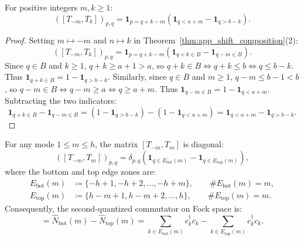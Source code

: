 \begin{lemma}
\label{lem:app_opposite_shift_matrix}
For positive integers $m, k \ge 1$:
\begin{equation}
([T_{-m}, T_k])_{p, q} = \mathbf{1}_{p = q + k - m} \left( \mathbf{1}_{q < a + m} - \mathbf{1}_{q > b - k} \right).
\end{equation}
\end{lemma}

\begin{proof}
Setting $m \mapsto -m$ and $n \mapsto k$ in Theorem~\ref{thm:app_shift_composition}(2):
\[
([T_{-m}, T_k])_{p, q} = \mathbf{1}_{p = q + k - m} \left( \mathbf{1}_{q + k \in B} - \mathbf{1}_{q - m \in B} \right).
\]
Since $q \in B$ and $k \ge 1$, $q + k \ge a + 1 > a$, so $q + k \in B \iff q + k \le b \iff q \le b - k$. Thus $\mathbf{1}_{q+k \in B} = 1 - \mathbf{1}_{q > b - k}$.
Similarly, since $q \in B$ and $m \ge 1$, $q - m \le b - 1 < b$, so $q - m \in B \iff q - m \ge a \iff q \ge a + m$. Thus $\mathbf{1}_{q-m \in B} = 1 - \mathbf{1}_{q < a + m}$.
Subtracting the two indicators:
\[
\mathbf{1}_{q+k \in B} - \mathbf{1}_{q-m \in B} = (1 - \mathbf{1}_{q > b - k}) - (1 - \mathbf{1}_{q < a + m}) = \mathbf{1}_{q < a + m} - \mathbf{1}_{q > b - k}.
\]
\end{proof}

\begin{theorem}
\label{thm:app_diagonal_edge}
For any mode $1 \le m \le h$, the matrix $[T_{-m}, T_m]$ is diagonal:
\begin{equation}
([T_{-m}, T_m])_{p, q} = \delta_{p, q} \left( \mathbf{1}_{q \in E_{\mathrm{bot}}(m)} - \mathbf{1}_{q \in E_{\mathrm{top}}(m)} \right),
\end{equation}
where the bottom and top edge zones are:
\begin{align}
E_{\mathrm{bot}}(m) &\coloneqq \{-h+1, -h+2, \dots, -h+m\}, \qquad \#E_{\mathrm{bot}}(m) = m, \\
E_{\mathrm{top}}(m) &\coloneqq \{h-m+1, h-m+2, \dots, h\}, \qquad \#E_{\mathrm{top}}(m) = m.
\end{align}
Consequently, the second-quantized commutator on Fock space is:
\begin{equation}
[\rho_{-m}, \rho_m] = \hat{N}_{\mathrm{bot}}(m) - \hat{N}_{\mathrm{top}}(m) = \sum_{k \in E_{\mathrm{bot}}(m)} c_k^\dagger c_k - \sum_{k \in E_{\mathrm{top}}(m)} c_k^\dagger c_k.
\end{equation}
\end{theorem}

